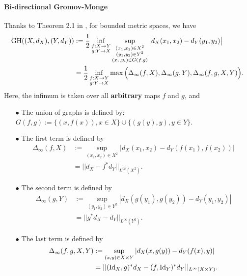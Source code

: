 \paragraph{Bi-directional Gromov-Monge}
Thanks to Theorem 2.1 in \citep{Kalton99}, for bounded metric spaces, we have
\begin{align} \label{kalton_form}
  \text{GH}((X,d_X), (Y,d_Y)) &:= \frac{1}{2} \inf_{\substack{f: X \to Y \\ g: Y \to X}}
  \sup_{\substack{(x_1, x_2) \in X^2 \\ (y_1, y_2) \in Y^2 \\
  (x_i, y_i) \in G(f,g)}} \big| d_X(x_1, x_2) - d_Y(y_1, y_2) \big| \\
  &= \frac{1}{2} \inf_{\substack{f: X \to Y \\ g: Y \to X}}
  \max \Big( \Delta_{\infty}(f, X), \Delta_{\infty}(g, Y), \Delta_{\infty}(f,g, X, Y) \Big).
\end{align}
Here, the infimum is taken over all \textbf{arbitrary} maps $f$ and $g$, and
\begin{itemize}
  \item[$\bullet$] The union of graphs is defined by:
  $G(f,g) := \{(x, f(x)), x \in X\} \cup \{(g(y), y), y \in Y \}$.

  \item[$\bullet$] The first term is defined by
  \begin{align}
    \Delta_{\infty}(f, X) &:=
    \sup_{(x_1, x_2) \in X^2} \left| d_X(x_1, x_2) - d_Y(f(x_1), f(x_2)) \right| \\
    &= || d_X - f^* d_Y ||_{L^{\infty}(X^2)}.
  \end{align}

  \item[$\bullet$] The second term is defined by
  \begin{align}
    \Delta_{\infty}(g, Y) &:= \sup_{(y_1, y_2) \in Y^2}
    \left| d_X(g(y_1), g(y_2)) - d_Y(y_1, y_2) \right| \\
    &= || g^*d_X - d_Y ||_{L^{\infty}(Y^2)}.
  \end{align}

  \item[$\bullet$] The last term is defined by
  \begin{align}
    \Delta_{\infty}(f,g, X, Y)
    &:= \sup_{(x, y) \in X \times Y} \left| d_X(x, g(y)) - d_Y(f(x),y) \right| \\
    &= || (\text{Id}_X, g)^*d_X - (f, \text{Id}_Y)^*d_Y ||_{L^{\infty}(X \times Y)}.
  \end{align}
\end{itemize}
